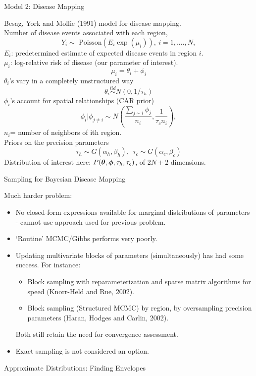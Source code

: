 \documentclass{report}
\newcommand{\bthet}{ \mbox{\boldmath $\theta$}}
\newcommand{\bphi}{ \mbox{\boldmath $\phi$}}
\newcommand{\head}[1]
{
  \begin{center}
      {\huge {\color{blue} #1}}
    \end{center}
  }
\begin{document}
 \newpage
 \LARGE \head{Model 2: Disease Mapping}
Besag, York and Mollie (1991) model for disease mapping.\\
  Number of disease events associated with each region,
 $$Y_{i} \sim \mbox{ Poisson}(E_{i}\exp(\mu_i)),\: i=1,....,N,$$
$E_i$: predetermined estimate of expected disease events in region $i$.\\
$\mu_i$: log-relative risk of disease (our parameter of interest).
 \[\mu_i = \theta_i + \phi_i\]
$\theta_i$'s vary in a completely unstructured way
 $$\theta_i \stackrel{iid}{\sim} N(0,1/\tau_h)$$
 $\phi_i$'s account for spatial relationships (CAR prior)
$$\phi_i|\phi_{j \neq i} \sim N\left(\frac{\sum_{j \sim i}\phi_j}{n_i}, \frac{1}{\tau_c{n_i}}\right),$$
$n_i$= number of neighbors of ith region.
\\
Priors on the precision parameters
 $$\tau_h \sim G(\alpha_h,\beta_h),\:\:\tau_c \sim G(\alpha_c,\beta_c)$$
 Distribution of interest here: $P(\bthet,\bphi,\tau_h,\tau_c)$, of $2N+2$ dimensions.
\newpage \head{Sampling for Bayesian Disease Mapping}
Much harder problem:
\begin{itemize}
\item No closed-form expressions available for marginal distributions
  of parameters - cannot use approach used for previous problem.
  \item `Routine' MCMC/Gibbs performs very poorly.
  \item Updating multivariate blocks of parameters (simultaneously) has had some success. For instance:
    \begin{itemize}
    \item Block sampling with reparameterization and sparse matrix algorithms for speed (Knorr-Held and Rue, 2002).
    \item Block sampling (Structured MCMC) by region, by oversampling precision parameters (Haran, Hodges and Carlin, 2002).
    \end{itemize}
  Both still retain the need for convergence assessment.
\item Exact sampling is not considered an option.
  \end{itemize}
\newpage \head{Approximate Distributions: Finding Envelopes} 
\end{document}
